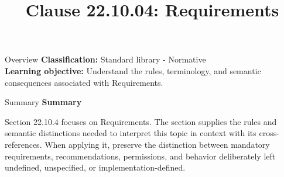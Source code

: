 \documentclass[10pt,letterpaper]{article}
\title{Clause 22.10.04: Requirements}
\author{}
\date{}
\begin{document}
\maketitle
\begin{CornellOverviewBox}{Overview}
\textbf{Classification:} Standard library - Normative\\[2pt]
\textbf{Learning objective:} Understand the rules, terminology, and semantic consequences associated with Requirements.
\end{CornellOverviewBox}\begin{CornellSummaryBox}{Summary}
{\sffamily\bfseries\color{Accent} Summary}\par\vspace{3pt}Section 22.10.4 focuses on Requirements. The section supplies the rules and semantic distinctions needed to interpret this topic in context with its cross-references. When applying it, preserve the distinction between mandatory requirements, recommendations, permissions, and behavior deliberately left undefined, unspecified, or implementation-defined.
\end{CornellSummaryBox}
\end{document}
